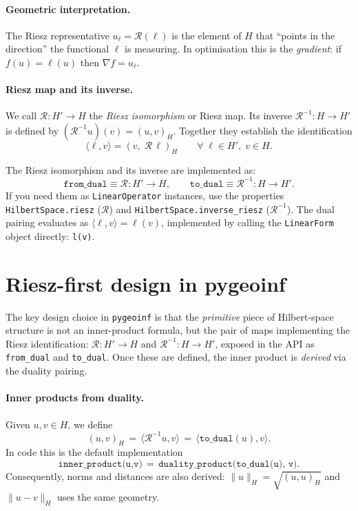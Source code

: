 \documentclass[11pt,twoside,openright]{book}
\theoremstyle{plain}
\theoremstyle{definition}
\theoremstyle{remark}
\newcommand{\pair}[2]{\langle #1, #2\rangle}
\newcommand{\Riesz}{\mathcal{R}}
\begin{document}
\paragraph{Geometric interpretation.}
The Riesz representative $u_\ell = \Riesz(\ell)$ is the element of $H$
that ``points in the direction'' the functional $\ell$ is measuring. In
optimisation this is the \emph{gradient}: if $f(u) = \ell(u)$ then
$\nabla f = u_\ell$.

\paragraph{Riesz map and its inverse.}
We call $\Riesz : H' \to H$ the \emph{Riesz isomorphism} or Riesz map.
Its inverse $\Riesz^{-1} : H \to H'$ is defined by $(\Riesz^{-1} u)(v) =
(u, v)_H$. Together they establish the identification
\begin{equation}
  \label{eq:riesz-iden}
  \langle \ell, v \rangle = (v,\; \Riesz\,\ell)_H
  \qquad \forall\; \ell \in H',\; v \in H.
\end{equation}

\begin{codebox}
The Riesz isomorphism and its inverse are implemented as:
\[
  \texttt{from\_dual} \equiv \Riesz : H' \to H, \qquad
  \texttt{to\_dual}   \equiv \Riesz^{-1} : H \to H'.
\]
If you need them as \texttt{LinearOperator} instances, use the properties
\texttt{HilbertSpace.riesz} ($\Riesz$) and
\texttt{HilbertSpace.inverse\_riesz} ($\Riesz^{-1}$). The dual pairing
evaluates as $\langle \ell, v\rangle = \ell(v)$, implemented by calling
the \texttt{LinearForm} object directly: \texttt{l(v)}.
\end{codebox}

\section{Riesz-first design in pygeoinf}
\label{sec:riesz-first-design}

The key design choice in \texttt{pygeoinf} is that the \emph{primitive} piece of
Hilbert-space structure is not an inner-product formula, but the pair of maps
implementing the Riesz identification:
\(\Riesz : H' \to H\) and \(\Riesz^{-1} : H \to H'\), exposed in the API as
\texttt{from\_dual} and \texttt{to\_dual}.
Once these are defined, the inner product is \emph{derived} via the duality
pairing.

\paragraph{Inner products from duality.}
Given $u,v \in H$, we define
\begin{equation}
  \label{eq:ip-from-to-dual}
  (u,v)_H \,=\, \pair{\Riesz^{-1}u}{v}
  \,=\, \pair{\texttt{to\_dual}(u)}{v}.
\end{equation}
In code this is the default implementation
\begin{equation*}
  \texttt{inner\_product(u,v)} \,=\, \texttt{duality\_product(to\_dual(u), v)}.
\end{equation*}
Consequently, norms and distances are also derived:
\(\|u\|_H = \sqrt{(u,u)_H}\) and \(\|u-v\|_H\) uses the same geometry.
\end{document}
